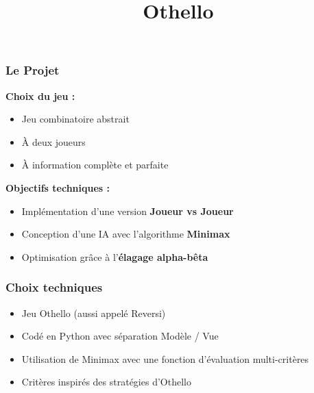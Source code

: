 \begin{frame}
\frametitle{Le Projet}

\textbf{Choix du jeu :}
\begin{itemize}
    \item Jeu combinatoire abstrait
    \item À deux joueurs
    \item À information complète et parfaite
\end{itemize}

\bigskip

\textbf{Objectifs techniques :}
\begin{itemize}
    \item Implémentation d’une version \textbf{Joueur vs Joueur}
    \item Conception d’une IA avec l’algorithme \textbf{Minimax}
    \item Optimisation grâce à l’\textbf{élagage alpha-bêta}
\end{itemize}
\end{frame}


\begin{frame}
\frametitle{Choix techniques}
\begin{itemize}
    \item Jeu Othello (aussi appelé Reversi)
    \item Codé en Python avec séparation Modèle / Vue
    \item Utilisation de Minimax avec une fonction d’évaluation multi-critères
    \item Critères inspirés des stratégies d’Othello
\end{itemize}
\end{frame}

\title{Othello}
\subtitle{}
\author{}
\institute{}
\date{}
\begin{frame}
	\maketitle
\end{frame}

